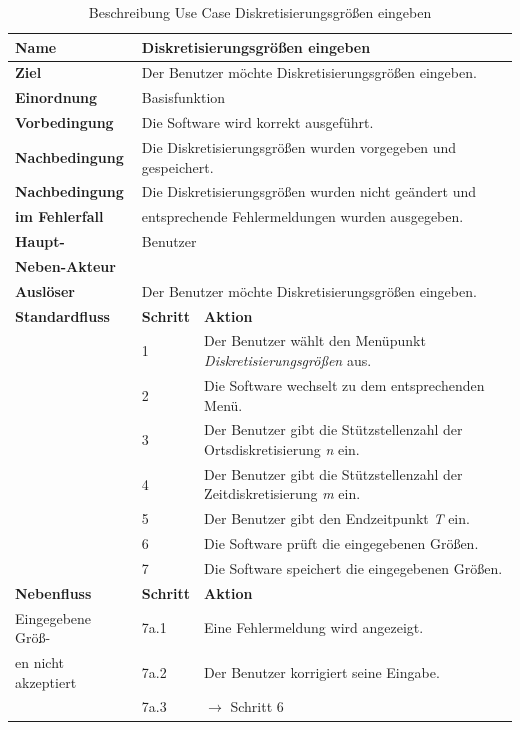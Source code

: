 \begin{table} [H]
	\centering
	\begin{tabular}{|l|l|l|}
		\hline
		\textbf{Name} 			& \multicolumn{2}{|l|}{Diskretisierungsgrößen eingeben}  \\
		\hline
		\textbf{Ziel} 			& \multicolumn{2}{|l|}{Der Benutzer möchte Diskretisierungsgrößen eingeben. }\\ 
		\hline
		\textbf{Einordnung}		& \multicolumn{2}{|l|}{Basisfunktion}\\
		\hline
		\textbf{Vorbedingung}	& \multicolumn{2}{|l|}{Die Software wird korrekt ausgeführt.} \\
		\hline
		\textbf{Nachbedingung}	& \multicolumn{2}{|l|}{Die Diskretisierungsgrößen wurden vorgegeben und gespeichert.}\\
		\hline
		\textbf{Nachbedingung} 	& \multicolumn{2}{|l|}{Die Diskretisierungsgrößen wurden nicht geändert und}\\
		\textbf{im Fehlerfall}	& \multicolumn{2}{|l|}{entsprechende Fehlermeldungen wurden ausgegeben.}\\
		\hline
		\textbf{Haupt-} 		& \multicolumn{2}{|l|}{Benutzer}\\
		\textbf{Neben-Akteur}	& \multicolumn{2}{|l|}{	}			\\
		\hline
		\textbf{Auslöser} 		& \multicolumn{2}{|l|}{Der Benutzer möchte Diskretisierungsgrößen eingeben.} \\
		\hline 
		\textbf{Standardfluss} & \textbf{Schritt} & \textbf{Aktion} \\
		\hline
		&	1	& Der Benutzer wählt den Menüpunkt \emph{Diskretisierungsgrößen} aus. \\
		\cline{2-3}
		&	2	& Die Software wechselt zu dem entsprechenden Menü.\\
		\cline{2-3}
		&	3	& Der Benutzer gibt die Stützstellenzahl der Ortsdiskretisierung \emph{n} ein.\\
		\cline{2-3}
		&	4	& Der Benutzer gibt die Stützstellenzahl der Zeitdiskretisierung \emph{m} ein.\\
		\cline{2-3}
		&	5	& Der Benutzer gibt den Endzeitpunkt \emph{T} ein.\\
		\cline{2-3}
		&	6	& Die Software prüft die eingegebenen Größen.\\
		\cline{2-3}
		&	7	& Die Software speichert die eingegebenen Größen.\\
		\hline
		\textbf{Nebenfluss} & \textbf{Schritt} & \textbf{Aktion}\\
		\hline
		Eingegebene Größ-  & 7a.1 & Eine Fehlermeldung wird angezeigt.\\
		\cline{2-3}
		en nicht akzeptiert & 7a.2	& Der Benutzer korrigiert seine Eingabe.\\
		\cline{2-3}
					& 7a.3 	& $\rightarrow$ Schritt 6\\
		\hline
	\end{tabular}
	\caption{Beschreibung Use Case Diskretisierungsgrößen eingeben}
	\label{Beschreibung Use Case Diskretisierungsgrössen eingeben}
\end{table}

